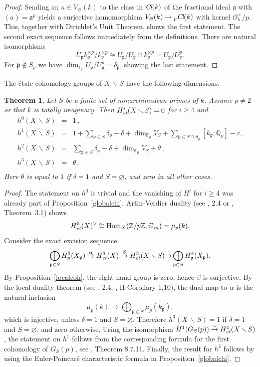 \documentclass[10pt]{article}
\newcommand{\Q}{{\mathbb Q}}
\newcommand{\Z}{{\mathbb Z}}
\newcommand{\F}{{\mathbb F}}
\newcommand{\G}{{\mathbb G}}
\renewcommand{\O}{{\mathcal{O}}}
\newcommand{\Cl}{\text{\it Cl}}
\newcommand{\p}{{\mathfrak p}}
\newcommand{\sm}{{\,\smallsetminus\,}}
\newcommand{\et}{\text{\it et}}
\newcommand{\Hom}{\text{\rm Hom}}
\newcommand{\ds}{\displaystyle}
\theoremstyle{alex}
\newtheorem{theorem}{Theorem}[section]
\theoremstyle{alexdef}
\begin{document}
\begin{proof}
Sending an $a\in V_\varnothing(k)$ to the class in $\Cl(k)$ of the fractional ideal $\mathfrak a$ with $(a)={\mathfrak a}^p$ yields a surjective homomorphism $V_\varnothing(k) \to \null_p\Cl(k)$ with kernel
$\O_k^\times /p$. This, together with Dirichlet's Unit Theorem, shows the first statement.
The second exact sequence follows immediately from the definitions.
There are natural isomorphisms
\[
U_\p k_\p^{\times p}/k_\p^{\times p}\cong U_\p/U_\p\cap k_\p^{\times p} = U_\p/ U_\p^{ p}.
\]
For $\p\notin S_p$ we have $\dim_{\F_p} U_\p/ U_\p^{p} = \delta_\p$,  showing the last statement.
\end{proof}



The \'{e}tale cohomology groups of $X\sm S$ have the following dimensions.
\renewcommand{\arraystretch}{1.5}
\begin{theorem} \label{globcoh} Let $S$ be a finite set of nonarchimedean primes of\/ $k$. Assume $p\neq 2$ or that $k$ is totally imaginary. Then $H^i_\et(X\sm S)=0$ for $i\geq 4$ and
\[
\begin{array}{lcl}
h^0(X \sm S)&=& 1\, ,\\
h^1(X \sm S) & = & 1+  \ds\sum_{\p\in S} \delta_\p
               - \delta + \dim_{\F_p}V_S +  \ds\sum_{\p\in S\cap S_p} [k_\p:\Q_p] -r,\\
h^2(X \sm S)& =& \ds\sum_{\p\in S} \delta_\p
               - \delta + \dim_{\F_p}V_S +\theta \, ,\\
h^3(X \sm S)&=& \theta\, .\\
\end{array}
\]
Here $\theta$ is equal to $1$ if\/ $\delta =1$ and $S=\varnothing$, and zero in all other cases.
\end{theorem}
\renewcommand{\arraystretch}{1}

\begin{proof}
The statement on $h^0$ is trivial and the vanishing of $H^i$ for $i\geq 4$ was already part of Proposition~\ref{globalchi}.  Artin-Verdier duality (see \cite{Ma}, 2.4 or \cite{Mi}, Theorem~3.1) shows
\[
H^3_\et(X)^\vee\cong\Hom_X(\Z/p\Z, \G_m)=\mu_p(k).
\]
Consider the exact excision sequence
\[
\bigoplus_{\p\in S} H^3_\p(X_\p) \stackrel{\alpha}{\to} H^3_\et (X) \stackrel{\beta}{\to} H^3_\et(X\sm S) {\to} \bigoplus_{\p\in S} H^4_\p(X_\p).
\]
By Proposition~\ref{localcoh}, the right hand group is zero, hence $\beta$ is surjective.  By the local duality theorem (see \cite{Ma}, 2.4, \cite{Mi}, II Corollary 1.10), the dual map  to $\alpha$ is the natural inclusion
\[
 \mu_p(k) \to \bigoplus_{\p\in S} \mu_p(k_\p),
\]
which is injective, unless $\delta=1$ and $S=\varnothing$.
Therefore $h^3(X \sm S)=1$ if $\delta=1$ and $S = \varnothing$, and zero otherwise.
Using the isomorphism
$H^1(G_S(p)) \stackrel{\sim}{\rightarrow} H^1_\et(X\sm S)$, the statement on $h^1$ follows from the corresponding formula for the first cohomology of $G_S(p)$, see \cite{NSW}, Theorem 8.7.11. Finally, the result for $h^2$ follows by using the Euler-Poincar\'{e} characteristic formula in Proposition~\ref{globalchi}.
\end{proof}
\end{document}
